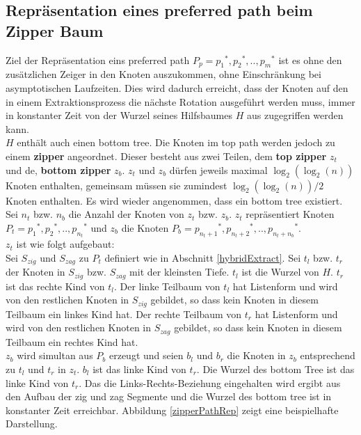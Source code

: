 \documentclass[a4paper,12pt]{article}
\begin{document}
\subsection{Repräsentation eines preferred path beim Zipper Baum}
Ziel der Repräsentation eins preferred path $P_p = {p_1}^*,{p_2}^*,..,{p_m}^*$ ist es ohne den zusätzlichen Zeiger in den Knoten auszukommen, ohne Einschränkung bei asymptotischen Laufzeiten. Dies wird dadurch erreicht, dass der Knoten auf den in einem Extraktionsprozess die nächste Rotation ausgeführt werden muss, immer in konstanter Zeit von der Wurzel seines Hilfsbaumes $H$ aus zugegriffen werden kann.\\
$H$ enthält auch einen bottom tree. Die Knoten im top path werden jedoch zu einem \textbf{zipper} angeordnet. Dieser besteht aus zwei Teilen, dem \textbf{top zipper} $z_t$ und de, \textbf{bottom zipper} $z_b$. $z_t$ und $z_b$ dürfen jeweils maximal $\log_2\left(\log_2\left(n\right)\right)$ Knoten enthalten, gemeinsam müssen sie zumindest $\log_2\left(\log_2\left(n\right)\right) / 2$ Knoten enthalten. Es wird wieder angenommen, dass ein bottom tree existiert. Sei $n_t$ bzw. $n_b$ die Anzahl der Knoten von $z_t$ bzw. $z_b$. $z_t$ repräsentiert Knoten  $P_t = {p_1}^*,{p_2}^*,..,{p_{n_t}}^*$ und $z_b$ die Knoten  $P_b = {p_{n_t + 1}}^*,{p_{n_t + 2}}^*,..,{p_{n_t + n_b}}^*$. \\
$z_t$ ist wie folgt aufgebaut:\\
Sei $S_{zig}$ und $S_{zag}$ zu $P_t$ definiert wie in Abschnitt \ref{hybridExtract}.
Sei $t_l$ bzw. $t_r$ der Knoten in $S_{zig}$ bzw. $S_{zag}$ mit der kleinsten Tiefe. $t_l$ ist die Wurzel von $H$. $t_r$ ist das rechte Kind von $t_l$. Der linke Teilbaum von $t_l$  hat Listenform und  wird von den restlichen Knoten in $S_{zig}$ gebildet, so dass kein Knoten in diesem Teilbaum ein linkes Kind hat. Der rechte Teilbaum von $t_r$  hat Listenform und  wird von den restlichen Knoten in $S_{zag}$ gebildet, so dass kein Knoten in diesem Teilbaum ein rechtes Kind hat. \\
$z_b$ wird simultan aus $P_b$ erzeugt und seien $b_l$ und $b_r$ die Knoten in $z_b$ entsprechend zu $t_l$ und $t_r$ in $z_t$. $b_l$ ist das linke Kind von $t_r$. Die Wurzel des bottom Tree ist das linke Kind von $t_r$. Das die Links-Rechts-Beziehung eingehalten wird ergibt aus den Aufbau der zig und zag Segmente und die Wurzel des bottom tree ist in konstanter Zeit erreichbar. Abbildung \ref{zipperPathRep} zeigt eine beispielhafte Darstellung. 
\end{document}
